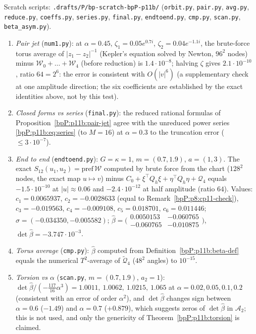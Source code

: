 Scratch scripts: \texttt{.drafts/P/bp-scratch-bpP-p11b/} (\texttt{orbit.py}, \texttt{pair.py}, \texttt{avg.py}, \texttt{reduce.py}, \texttt{coeffs.py}, \texttt{series.py}, \texttt{final.py}, \texttt{endtoend.py}, \texttt{cmp.py}, \texttt{scan.py}, \texttt{beta\_asym.py}).
\begin{enumerate}
\item \emph{Pair jet} (\texttt{num1.py}): at $\alpha=0.45$, $\zeta_1=0.05e^{0.7i}$, $\zeta_2=0.04e^{-1.1i}$, the brute-force torus average of $|z_1-z_2|^{-1}$ (Kepler's equation solved by Newton, $96^2$ nodes) minus $\mathcal W_0+\dots+\mathcal W_4$ (before reduction) is $1.4\cdot10^{-8}$; halving $\zeta$ gives $2.1\cdot10^{-10}$, ratio $64=2^6$: the error is consistent with $O(\lvert v\rvert^6)$ (a supplementary check at one amplitude direction; the six coefficients are established by the exact identities above, not by this test).
\item \emph{Closed forms vs series} (\texttt{final.py}): the reduced rational formulas of Proposition~\ref{bpP:p11b:pair-jet} agree with the unreduced power series \eqref{bpP:p11b:eq:series} (to $M=16$) at $\alpha=0.3$ to the truncation error ($\le3\cdot10^{-7}$).
\item \emph{End to end} (\texttt{endtoend.py}): $G=\kappa=1$, $m=(0.7,1.9)$, $a=(1,3)$. The exact $S_{12}(u_1,u_2)=\mathrm{pref}\,\mathcal W$ computed by brute force from the chart ($128^2$ nodes, the exact map $u\mapsto v$) minus $C_0+\xi^\top Q_h\xi+\eta^\top Q_h\eta+\mathcal Q_4$ equals $-1.5\cdot10^{-10}$ at $\lvert u\rvert\approx0.06$ and $-2.4\cdot10^{-12}$ at half amplitude (ratio $64$). Values: $c_1=0.0065937$, $c_2=-0.0028633$ (equal to Remark~\ref{bpP:p8:cp11-check}), $c_3=-0.019563$, $c_4=-0.009108$, $c_5=0.018701$, $c_6=0.011446$; $\sigma=(-0.034350,-0.005582)$; $\hat\beta=\big(\begin{smallmatrix}0.0050153&-0.060765\\-0.060765&-0.010875\end{smallmatrix}\big)$, $\det\hat\beta=-3.747\cdot10^{-3}$.
\item \emph{Torus average} (\texttt{cmp.py}): $\hat\beta$ computed from Definition~\ref{bpP:p11b:beta-def} equals the numerical $T^2$-average of $\tilde{\mathcal Q}_4$ ($48^2$ angles) to $10^{-15}$.
\item \emph{Torsion vs $\alpha$} (\texttt{scan.py}, $m=(0.7,1.9)$, $a_2=1$): $\det\hat\beta/(-\frac{117}{16}\alpha^3)=1.0011,\ 1.0062,\ 1.0215,\ 1.065$ at $\alpha=0.02,0.05,0.1,0.2$ (consistent with an error of order $\alpha^2$), and $\det\hat\beta$ changes sign between $\alpha=0.6$ ($-1.49$) and $\alpha=0.7$ ($+0.879$), which suggests zeros of $\det\hat\beta$ in $\mathcal A_2$; this is not used, and only the genericity of Theorem~\ref{bpP:p11b:torsion} is claimed.

\end{enumerate}

